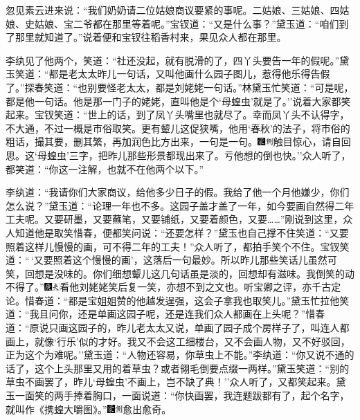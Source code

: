忽见素云进来说：``我们奶奶请二位姑娘商议要紧的事呢。二姑娘、三姑娘、四姑娘、史姑娘、宝二爷都在那里等着呢。''宝钗道：``又是什么事？''黛玉道：``咱们到了那里就知道了。''说着便和宝钗往稻香村来，果见众人都在那里。

李纨见了他两个，笑道：``社还没起，就有脱滑的了，四丫头要告一年的假呢。''黛玉笑道：``都是老太太昨儿一句话，又叫他画什么园子图儿，惹得他乐得告假了。''探春笑道：``也别要怪老太太，都是刘姥姥一句话。''林黛玉忙笑道：``可是呢，都是他一句话。他是那一门子的姥姥，直叫他是个`母蝗虫'就是了。''说着大家都笑起来。宝钗笑道：``世上的话，到了凤丫头嘴里也就尽了。幸而凤丫头不认得字，不大通，不过一概是市俗取笑。更有颦儿这促狭嘴，他用`春秋'的法子，将市俗的粗话，撮其要，删其繁，再加润色比方出来，一句是一句。{\includegraphics[width=3mm]{../Images/00006}\includegraphics[width=3mm]{../Images/00011}\footnotesize \kaishu 触目惊心，请自回思。}这`母蝗虫'三字，把昨儿那些形景都现出来了。亏他想的倒也快。''众人听了，都笑道：``你这一注解，也就不在他两个以下。''

李纨道：``我请你们大家商议，给他多少日子的假。我给了他一个月他嫌少，你们怎么说？''黛玉道：``论理一年也不多。这园子盖才盖了一年，如今要画自然得二年工夫呢。又要研墨，又要蘸笔，又要铺纸，又要着颜色，又要\ldots{}\ldots{}''刚说到这里，众人知道他是取笑惜春，便都笑问说：``还要怎样？''黛玉也自己撑不住笑道：``又要照着这样儿慢慢的画，可不得二年的工夫！''众人听了，都拍手笑个不住。宝钗笑道：``\,`又要照着这个慢慢的画'，这落后一句最妙。所以昨儿那些笑话儿虽然可笑，回想是没味的。你们细想颦儿这几句话虽是淡的，回想却有滋味。我倒笑的动不得了。''{\includegraphics[width=3mm]{../Images/00004}\includegraphics[width=3mm]{../Images/00012}\footnotesize \kaishu 看他刘姥姥笑后复一笑，亦想不到之文也。听宝卿之评，亦千古定论。}惜春道：``都是宝姐姐赞的他越发逞强，这会子拿我也取笑儿。''黛玉忙拉他笑道：``我且问你，还是单画这园子呢，还是连我们众人都画在上头呢？''惜春道：``原说只画这园子的，昨儿老太太又说，单画了园子成个房样子了，叫连人都画上，就像`行乐'似的才好。我又不会这工细楼台，又不会画人物，又不好驳回，正为这个为难呢。''黛玉道：``人物还容易，你草虫上不能。''李纨道：``你又说不通的话了，这个上头那里又用的着草虫？或者翎毛倒要点缀一两样。''黛玉笑道：``别的草虫不画罢了，昨儿`母蝗虫'不画上，岂不缺了典！''众人听了，又都笑起来。黛玉一面笑的两手捧着胸口，一面说道：``你快画罢，我连题跋都有了，起个名字，就叫作《携蝗大嚼图》。''{\includegraphics[width=3mm]{../Images/00006}\includegraphics[width=3mm]{../Images/00011}\footnotesize \kaishu 愈出愈奇。}

